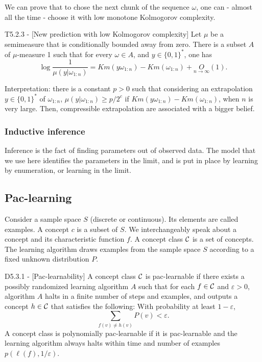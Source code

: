 \documentclass{article}
\begin{document}
We can prove that to chose the next chunk of the sequence $\omega$, one can - almost all the time - choose it with low monotone Kolmogorov complexity. 

\begin{flexitheorem}{T5.2.3 - }[New prediction with low Kolmogorov complexity]
    Let $\mu$ be a semimeasure that is conditionally bounded away from zero. There is a subset $A$ of $\mu$-measure 1 such that for every $\omega \in A$, and $y \in \{0,1\}^\ast$, one has
    \begin{equation}
        \log \frac{1}{\mu(y|\omega_{1:n})} = Km(y\omega_{1:n}) - Km(\omega_{1:n}) + \underset{n \to \infty}{O}(1).
    \end{equation}
\end{flexitheorem}

Interpretation: there is a constant $p>0$ such that considering an extrapolation $y \in \{0,1\}^\ast$ of $\omega_{1:n}$,  $\mu(y|\omega_{1:n}) \geq p/2^c$ if $Km(y\omega_{1:n}) - Km(\omega_{1:n})$, when $n$ is very large. Then, compressible extrapolation are associated with a bigger belief.

\subsubsection{Inductive inference}

Inference is the fact of finding parameters out of observed data. The model that we use here identifies the parameters in the limit, and is put in place by learning by enumeration, or learning in the limit.

\subsection{Pac-learning}

Consider a sample space $S$ (discrete or continuous). Its elements are called examples. A concept $c$ is a subset of $S$. We interchangeably speak about a concept and its characteristic function $f$. A concept class $\mathcal{C}$ is a set of concepts. The learning algorithm draws examples from the sample space $S$ according to a fixed unknown distribution $P$.

\begin{flexidefinition}{D5.3.1 - }[Pac-learnability]
    A concept class $\mathcal{C}$ is pac-learnable if there exists a possibly randomized learning algorithm $A$ such that for each $f \in \mathcal{C}$ and $\varepsilon > 0$, algorithm $A$ halts in a finite number of steps and examples, and outputs a concept $h \in \mathcal{C}$ that satisfies the following: With probability at least $1 - \varepsilon$,
    \begin{equation}
        \sum_{f(v) \neq h(v)} P(v) < \varepsilon.
    \end{equation}
    A concept class is polynomially pac-learnable if it is pac-learnable and the learning algorithm always halts within time and number of examples $p(\ell(f), 1/\varepsilon)$.
\end{flexidefinition}
\end{document}
